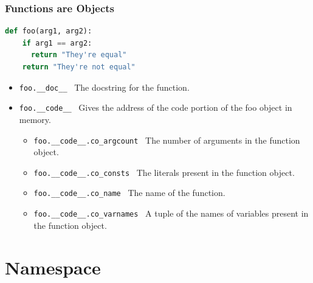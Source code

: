 \documentclass{beamer}
\begin{document}
%
%
\begin{frame}[fragile]
  \frametitle{Functions are Objects}

  \begin{lstlisting}[language=Python, autogobble]
  def foo(arg1, arg2):
    if arg1 == arg2:
      return "They're equal"
    return "They're not equal"
  \end{lstlisting}
  \vfill
  \begin{itemize}
    \pause
    \item \lstinline|foo.__doc__| \textrightarrow \ The docstring for the function.
    \pause
    \item \lstinline|foo.__code__| \textrightarrow \ Gives the address of the code portion of the foo object in memory.
      \begin{itemize}
        \pause
        \item \lstinline|foo.__code__.co_argcount| \textrightarrow \ The number of arguments in the function object.
        \pause
        \item \lstinline|foo.__code__.co_consts| \textrightarrow \ The literals present in the function object.
        \pause
        \item \lstinline|foo.__code__.co_name| \textrightarrow \ The name of the function.
        \pause
        \item \lstinline|foo.__code__.co_varnames| \textrightarrow \ A tuple of the names of variables present in the function object.
      \end{itemize}
  \end{itemize}
\end{frame}

\section{Namespace}
\end{document}
